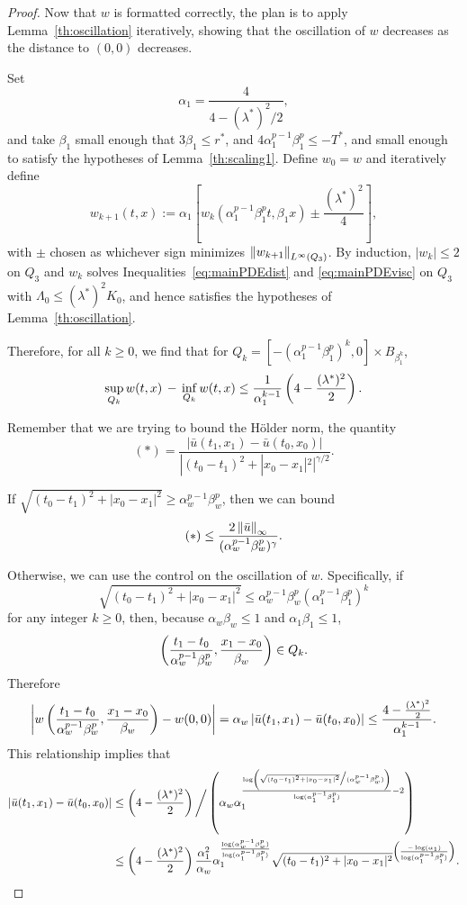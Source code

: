 \begin{proof}
Now that $w$ is formatted correctly, the plan is to apply Lemma~\ref{th:oscillation} iteratively, showing that the oscillation of $w$ decreases as the distance to $(0,0)$ decreases.  

Set
\[ \alpha_1 = \frac{4}{4-(\lambda^*)^2/2},\]
and take $\beta_1$ small enough that $3 \beta_1 \leq r^*$, and $4\alpha_1^{p-1}\beta_1^p \leq -T^*$, and small enough to satisfy the hypotheses of Lemma~\ref{th:scaling1}.  Define $w_0 = w$ and iteratively define
\[ w_{k+1}(t,x) := \alpha_1 \left[ w_k(\alpha_1^{p-1} \beta_1^p t, \beta_1 x) \pm \frac{(\lambda^*)^2}{4} \right], \]
with $\pm$ chosen as whichever sign minimizes $\left\lVert w_{k+1}\right\rVert_{L^\infty(Q_3)}$.  By induction, $|w_k| \leq 2$ on $Q_3$ and $w_k$ solves Inequalities~\eqref{eq:mainPDEdist} and \eqref{eq:mainPDEvisc} on $Q_3$ with $\Lambda_0 \leq (\lambda^\ast)^2 K_0$, and hence satisfies the hypotheses of Lemma~\ref{th:oscillation}.  

Therefore, for all $k \geq 0$, we find that for $Q_k = [-(\alpha_1^{p-1}\beta_1^p)^k,0]\times B_{\beta_1^k}$,
\[ \sup_{Q_k} w(t,x) \, - \, \inf_{Q_k} w(t,x) \leq \frac{1}{\alpha_1^{k-1}} \left( 4-\frac{(\lambda^*)^2}{2} \right). \]


Remember that we are trying to bound the H\"{o}lder norm, the quantity
\[ (*) = \frac{|\bar{u}(t_1,x_1) - \bar{u}(t_0,x_0)|}{|(t_0-t_1)^2 + |x_0-x_1|^2|^{\gamma/2}}. \]

If $\sqrt{(t_0-t_1)^2 + |x_0 - x_1|^2} \geq \alpha_w^{p-1} \beta_w^p$, then we can bound
\[ (*) \leq \frac{2 \left\lVert\bar{u}\right\rVert_\infty}{( \alpha_w^{p-1}\beta_w^p )^\gamma}. \]

Otherwise, we can use the control on the oscillation of $w$.  Specifically, if
\[ \sqrt{(t_0-t_1)^2 + |x_0-x_1|^2} \leq \alpha_w^{p-1} \beta_w^p (\alpha_1^{p-1}\beta_1^p)^k \]
for any integer $k \geq 0$, then, because $\alpha_w \beta_w \leq 1$ and $\alpha_1 \beta_1 \leq 1$, 
\[ \left( \frac{t_1-t_0}{\alpha_w^{p-1} \beta_w^p}, \frac{x_1-x_0}{\beta_w} \right) \in Q_k.\]
Therefore
\[ \left\lvert  w\left( \frac{t_1-t_0}{\alpha_w^{p-1} \beta_w^p}, \frac{x_1-x_0}{\beta_w} \right) - w(0,0)  \right\rvert = \alpha_w \left\lvert \bar{u}(t_1,x_1) - \bar{u}(t_0,x_0) \right\rvert \leq \frac{4-\frac{(\lambda^*)^2}{2}}{\alpha_1^{k-1}}. \]
This relationship implies that 
\begin{align*}
|\bar{u}(t_1,x_1) - \bar{u}(t_0,x_0)| &\leq \left( 4-\frac{(\lambda^*)^2}{2} \right) \bigg/ \left(  \alpha_w \alpha_1^{ \frac{\log\left( \sqrt{(t_0-t_1)^2 + |x_0-x_1|^2}\big/(\alpha_w^{p-1} \beta_w^p) \right)}{\log(\alpha_1^{p-1} \beta_1^p)} - 2}  \right)
\\ &\leq \left( 4-\frac{(\lambda^*)^2}{2} \right) \frac{\alpha_1^2}{\alpha_w} \alpha_1^\frac{\log(\alpha_w^{p-1} \beta_w^p)}{\log(\alpha_1^{p-1} \beta_1^p)} \sqrt{(t_0-t_1)^2 + |x_0-x_1|^2}^{\left( \frac{-\log(\alpha_1)}{\log(\alpha_1^{p-1} \beta_1^p)} \right)}. 
\end{align*}


\end{proof}
